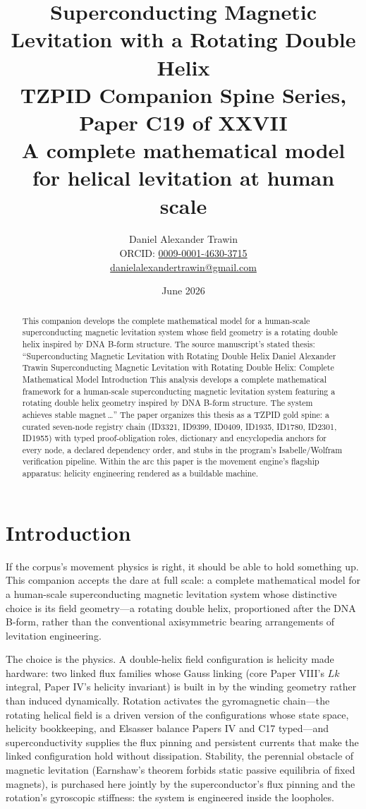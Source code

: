 \documentclass[11pt]{article}
\title{Superconducting Magnetic Levitation with a Rotating Double Helix\\[0.6em]
\large TZPID Companion Spine Series, Paper C19 of XXVII\\
\normalsize A complete mathematical model for helical levitation at human scale}
\author{Daniel Alexander Trawin\\
\small ORCID: \href{https://orcid.org/0009-0001-4630-3715}{0009-0001-4630-3715}\\
\small \href{mailto:danielalexandertrawin@gmail.com}{danielalexandertrawin@gmail.com}}
\date{June 2026}
\theoremstyle{remark}
\begin{document}
\maketitle

\begin{abstract}
This companion develops the complete mathematical model for a human-scale superconducting magnetic levitation system whose field geometry is a rotating double helix inspired by DNA B-form structure.
The source manuscript's stated thesis: ``Superconducting Magnetic Levitation with Rotating Double Helix Daniel Alexander Trawin Superconducting Magnetic Levitation with Rotating Double Helix: Complete Mathematical Model Introduction This analysis develops a complete mathematical framework for a human-scale superconducting magnetic levitation system featuring a rotating double helix geometry inspired by DNA B-form structure. The system achieves stable magnet\,\ldots'' The paper organizes this thesis as a TZPID gold spine: a curated seven-node registry chain (ID3321, ID9399, ID0409, ID1935, ID1780, ID2301, ID1955) with typed proof-obligation roles, dictionary and encyclopedia anchors for every node, a declared dependency order, and stubs in the program's Isabelle/Wolfram verification pipeline. Within the arc this paper is the movement engine's flagship apparatus: helicity engineering rendered as a buildable machine.
\end{abstract}

\section{Introduction}
\label{sec:intro}

If the corpus's movement physics is right, it should be able to hold something up. This companion accepts the dare at full scale: a complete mathematical model for a human-scale superconducting magnetic levitation system whose distinctive choice is its field geometry---a rotating double helix, proportioned after the DNA B-form, rather than the conventional axisymmetric bearing arrangements of levitation engineering.

The choice is the physics. A double-helix field configuration is helicity made hardware: two linked flux families whose Gauss linking (core Paper VIII's $Lk$ integral, Paper IV's helicity invariant) is built in by the winding geometry rather than induced dynamically. Rotation activates the gyromagnetic chain---the rotating helical field is a driven version of the configurations whose state space, helicity bookkeeping, and Elsasser balance Papers IV and C17 typed---and superconductivity supplies the flux pinning and persistent currents that make the linked configuration hold without dissipation. Stability, the perennial obstacle of magnetic levitation (Earnshaw's theorem forbids static passive equilibria of fixed magnets), is purchased here jointly by the superconductor's flux pinning and the rotation's gyroscopic stiffness: the system is engineered inside the loopholes.
\end{document}
